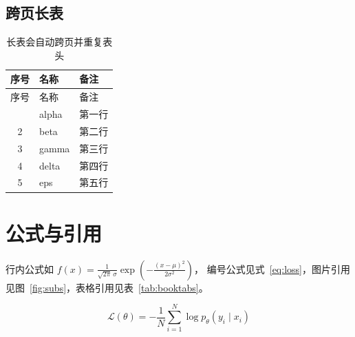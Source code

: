 \documentclass[UTF8,11pt]{ctexart}
\begin{document}
\subsection{跨页长表}

\begin{longtable}{@{}cll@{}}
  \caption{长表会自动跨页并重复表头}\label{tab:long}\\
  \toprule
  序号 & 名称 & 备注 \\
  \midrule
  \endfirsthead
  \toprule
  序号 & 名称 & 备注 \\
  \midrule
  \endhead
  \bottomrule
  \endfoot
  1 & alpha & 第一行 \\
  2 & beta  & 第二行 \\
  3 & gamma & 第三行 \\
  4 & delta & 第四行 \\
  5 & eps   & 第五行 \\
\end{longtable}

\section{公式与引用}

行内公式如 $f(x)=\frac{1}{\sqrt{2\pi}\,\sigma}\exp\!\left(-\frac{(x-\mu)^2}{2\sigma^2}\right)$，
编号公式见式~\eqref{eq:loss}，图片引用见图~\ref{fig:subs}，表格引用见表~\ref{tab:booktabs}。

\begin{equation}
  \mathcal{L}(\theta) = -\frac{1}{N}\sum_{i=1}^{N} \log p_\theta(y_i \mid x_i)
  \label{eq:loss}
\end{equation}
\end{document}
